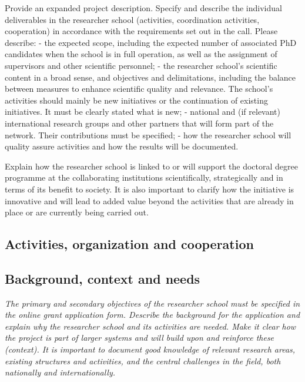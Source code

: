 \documentclass{scrreprt}
\begin{document}
Provide an expanded project description. Specify and describe the individual deliverables in the researcher school (activities, coordination activities, cooperation) in accordance with the requirements set out in the call. Please describe:
-	the expected scope, including the expected number of associated PhD candidates when the school is in full operation, as well as the assignment of supervisors and other scientific personnel;
-	the researcher school's scientific content in a broad sense, and objectives and delimitations, including the balance between measures to enhance scientific quality and relevance. The school’s activities should mainly be new initiatives or the continuation of existing initiatives. It must be clearly stated what is new;
-	national and (if relevant) international research groups and other partners that will form part of the network. Their contributions must be specified;
-	how the researcher school will quality assure activities and how the results will be documented.


Explain how the researcher school is linked to or will support the
doctoral degree programme at the collaborating institutions
scientifically, strategically and in terms of its benefit to
society. It is also important to clarify how the initiative is
innovative and will lead to added value beyond the activities that are
already in place or are currently being carried out.




\subsection{Activities, organization and cooperation}


\subsection{Background, context and needs}

{\em The primary and secondary objectives of the researcher school must be
specified in the online grant application form.  Describe the
background for the application and explain why the researcher school
and its activities are needed. Make it clear how the project is part
of larger systems and will build upon and reinforce these
(context). It is important to document good knowledge of relevant
research areas, existing structures and activities, and the central
challenges in the field, both nationally and internationally.}
\end{document}
